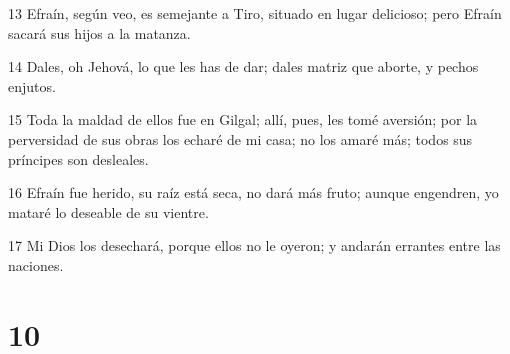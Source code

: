 \par 13 Efraín, según veo, es semejante a Tiro, situado en lugar delicioso; pero Efraín sacará sus hijos a la matanza.
\par 14 Dales, oh Jehová, lo que les has de dar; dales matriz que aborte, y pechos enjutos.
\par 15 Toda la maldad de ellos fue en Gilgal; allí, pues, les tomé aversión; por la perversidad de sus obras los echaré de mi casa; no los amaré más; todos sus príncipes son desleales.
\par 16 Efraín fue herido, su raíz está seca, no dará más fruto; aunque engendren, yo mataré lo deseable de su vientre.
\par 17 Mi Dios los desechará, porque ellos no le oyeron; y andarán errantes entre las naciones.

\chapter{10}

